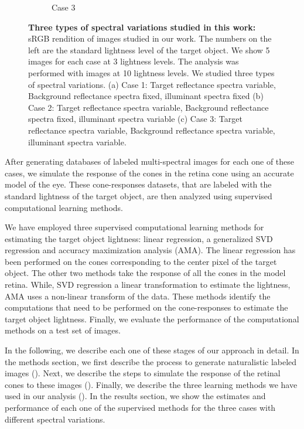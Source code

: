 \documentclass{jov}
\begin{document}
\begin{figure}
\begin{subfigure}[b]{0.33 \textwidth}
        \caption{Case 3}
        \label{fig:allSpectraVarying}
    \end{subfigure}    
    \caption{{\bf Three types of spectral variations studied in this work:} sRGB rendition of images studied in our work. The numbers on the left are the standard lightness level of the target object. We show 5 images for each case at 3 lightness levels. The analysis was performed with images at 10 lightness levels. We studied three types of spectral variations. (a) Case 1: Target reflectance spectra variable, Background reflectance spectra fixed, illuminant spectra fixed (b) Case 2: Target reflectance spectra variable, Background reflectance spectra fixed, illuminant spectra variable (c) Case 3: Target reflectance spectra variable, Background reflectance spectra variable, illuminant spectra variable.}
\label{fig:studiedCases}
\end{figure}

After generating databases of labeled multi-spectral images for each one of these cases, we simulate the response of the cones in the retina cone using an accurate model of the eye. These cone-responses datasets, that are labeled with the standard lightness of the target object, are then analyzed using supervised computational learning methods. 

We have employed three supervised computational learning methods for estimating the target object lightness: linear regression, a generalized SVD regression and accuracy maximization analysis (AMA). The linear regression has been performed on the cones corresponding to the center pixel of the target object. The other two methods take the response of all the cones in the model retina. While, SVD regression a linear transformation to estimate the lightness, AMA uses a non-linear transform of the data. These methods identify the computations that need to be performed on the cone-responses to estimate the target object lightness. Finally, we evaluate the performance of the computational methods on a test set of images.

In the following, we describe each one of these stages of our approach in detail. In the methods section, we first describe the process to generate naturalistic labeled images (). Next, we describe the steps to simulate the response of the retinal cones to these images (). Finally, we describe the three learning methods we have used in our analysis (). In the results section, we show the estimates and performance of each one of the supervised methods for the three cases with different spectral variations. 
\end{document}
